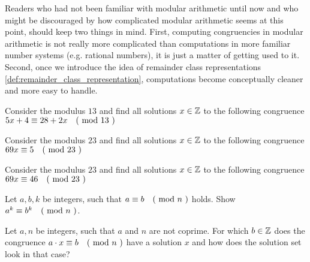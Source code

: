 Readers who had not been familiar with modular arithmetic until now and who might be discouraged by how complicated modular arithmetic seems at this point, should keep two things in mind. First, computing congruencies in modular arithmetic is not really more complicated than computations in more familiar number systems (e.g. rational numbers), it is just a matter of getting used to it. Second, once we introduce the idea of remainder class representations \ref{def:remainder_class_representation}, computations become conceptually cleaner and more easy to handle.
\begin{exercise}
\label{exercise_congruence_in_F13}
Consider the modulus $13$ and find all solutions $x\in \mathbb{Z}$ to the following congruence $5x+4 \equiv 28+2x \quad \text{( mod } 13 \text{ )}$
\end{exercise}
\begin{exercise}Consider the modulus $23$ and find all solutions $x\in \mathbb{Z}$ to the following congruence $69x \equiv 5 \quad \text{( mod } 23 \text{ )}$
\end{exercise}
\begin{exercise}Consider the modulus $23$ and find all solutions $x\in \mathbb{Z}$ to the following congruence $69x \equiv 46 \quad \text{( mod } 23 \text{ )}$
\end{exercise}
\begin{exercise}
Let $a,b,k$ be integers, such that $a \equiv b \quad \text{( mod } n \text{ )}$ holds. Show $a^k \equiv b^k \quad \text{( mod } n \text{ )}$.
\end{exercise}
\begin{exercise}
Let $a,n$ be integers, such that $a$ and $n$ are not coprime. For which $b\in\mathbb{Z}$ does the congruence $a\cdot x \equiv b \quad \text{( mod } n \text{ )}$ have a solution $x$ and how does the solution set look in that case?
\end{exercise}
